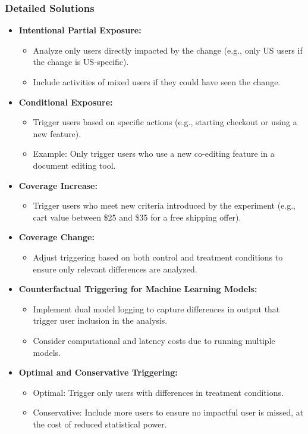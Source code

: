 \documentclass{article}
\begin{document}
\subsubsection*{Detailed Solutions}
\begin{itemize}
    \item \textbf{Intentional Partial Exposure:}
    \begin{itemize}
        \item Analyze only users directly impacted by the change (e.g., only US users if the change is US-specific).
        \item Include activities of mixed users if they could have seen the change.
    \end{itemize}

    \item \textbf{Conditional Exposure:}
    \begin{itemize}
        \item Trigger users based on specific actions (e.g., starting checkout or using a new feature).
        \item Example: Only trigger users who use a new co-editing feature in a document editing tool.
    \end{itemize}

    \item \textbf{Coverage Increase:}
    \begin{itemize}
        \item Trigger users who meet new criteria introduced by the experiment (e.g., cart value between \$25 and \$35 for a free shipping offer).
    \end{itemize}

    \item \textbf{Coverage Change:}
    \begin{itemize}
        \item Adjust triggering based on both control and treatment conditions to ensure only relevant differences are analyzed.
    \end{itemize}

    \item \textbf{Counterfactual Triggering for Machine Learning Models:}
    \begin{itemize}
        \item Implement dual model logging to capture differences in output that trigger user inclusion in the analysis.
        \item Consider computational and latency costs due to running multiple models.
    \end{itemize}

    \item \textbf{Optimal and Conservative Triggering:}
    \begin{itemize}
        \item Optimal: Trigger only users with differences in treatment conditions.
        \item Conservative: Include more users to ensure no impactful user is missed, at the cost of reduced statistical power.
    \end{itemize}
\end{itemize}
\end{document}
